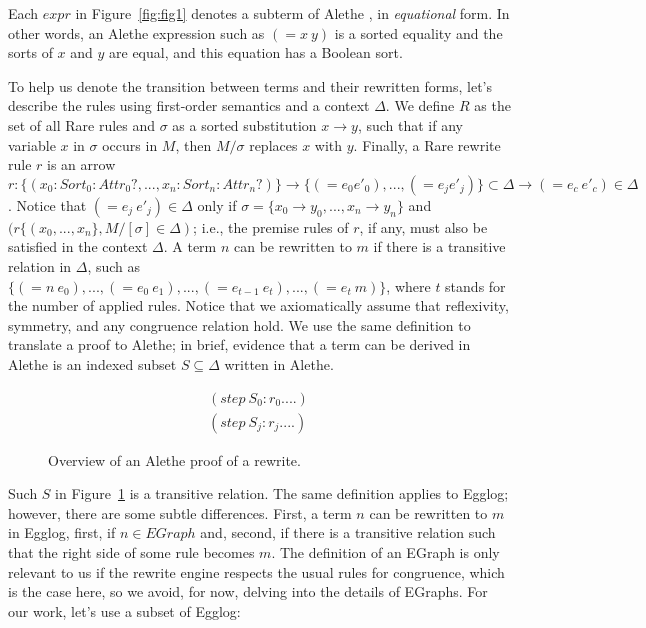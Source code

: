 \documentclass{article}
\begin{document}
Each $expr$ in Figure~\ref{fig:fig1} denotes a subterm of Alethe \cite{Schurr_2021}, in \emph{equational} form. In other words, an Alethe expression such as $(= x\:y)$ is a sorted equality and the sorts of $x$ and $y$ are equal, and this equation has a Boolean sort. 

To help us denote the transition between terms and their rewritten forms, let's describe the rules using first-order semantics and a context $\Delta$. We define $R$ as the set of all Rare rules and $\sigma$ as a sorted substitution ${x\longrightarrow y}$, such that if any variable $x$ in $\sigma$ occurs in $M$, then $M/\sigma$ replaces $x$ with $y$. Finally, a Rare rewrite rule $r$ is an arrow $r : \{(x_{0} : Sort_{0} :Attr_{0}?, ..., x_{n} : Sort_{n} :Attr_{n}?)\} \rightarrow \{(= e_{0} e'_{0}), ...,  (= e_{j} e'_{j})\} \subset \Delta \rightarrow (= e_{c}\: e'_{c}) \in \Delta$. Notice that $(= e_{j}\:e'_{j}) \in \Delta$ only if $\sigma=\{x_{0} \longrightarrow y_{0}, ..., x_{n} \longrightarrow y_{n}\}$ and $(r \{(x_{0}, ..., x_{n}\}, M/[\sigma] \in \Delta)$; i.e., the premise rules of $r$, if any, must also be satisfied in the context $\Delta$. A term $n$ can be rewritten to $m$ if there is a transitive relation in $\Delta$, such as $\{(= n\:e_{0}), ..., (= e_{0}\:e_{1}), ..., (= e_{t-1}\:e_{t}), ..., (= e_{t}\:m)\}$, where $t$ stands for the number of applied rules. Notice that we axiomatically assume that reflexivity, symmetry, and any congruence relation hold. We use the same definition to translate a proof to Alethe; in brief, evidence that a term can be derived in Alethe is an indexed subset $S \subseteq \Delta$ written in Alethe.

\begin{figure}[h]
\centering
\[
\begin{aligned}
(step\:S_{0} :r_{0}. ...)\: \\
(step\:S_{j} :r_{j}. ...)\: 
\end{aligned}
\]
\caption{\label{fig:fig2} Overview of an Alethe proof of a rewrite.}
\end{figure}

Such $S$ in Figure~\ref{fig:fig2} is a transitive relation. The same definition applies to Egglog; however, there are some subtle differences. First, a term $n$ can be rewritten to $m$ in Egglog, first, if $n \in EGraph$ and, second, if there is a transitive relation such that the right side of some rule becomes $m$. The definition of an EGraph is only relevant to us if the rewrite engine respects the usual rules for congruence, which is the case here, so we avoid, for now, delving into the details of EGraphs. For our work, let's use a subset of Egglog:
\end{document}
